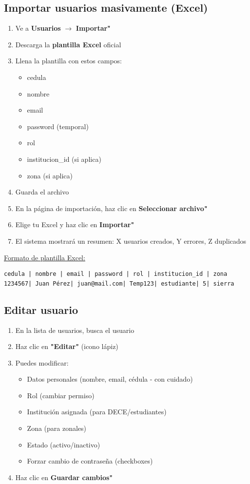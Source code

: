\documentclass[12pt, a4paper]{report}
\begin{document}
\subsection{Importar usuarios masivamente (Excel)}
\begin{enumerate}
    \item Ve a \textbf{Usuarios} $\rightarrow$ \textbf{Importar"}
    \item Descarga la \textbf{plantilla Excel} oficial
    \item Llena la plantilla con estos campos:
    \begin{itemize}
        \item cedula
        \item nombre
        \item email
        \item password (temporal)
        \item rol
        \item institucion\_id (si aplica)
        \item zona (si aplica)
    \end{itemize}
    \item Guarda el archivo
    \item En la página de importación, haz clic en \textbf{Seleccionar archivo"}
    \item Elige tu Excel y haz clic en \textbf{Importar"}
    \item El sistema mostrará un resumen: X usuarios creados, Y errores, Z duplicados
\end{enumerate}

\underline{Formato de plantilla Excel:}
\begin{lstlisting}[basicstyle=\ttfamily\small]
cedula | nombre | email | password | rol | institucion_id | zona
1234567| Juan Pérez| juan@mail.com| Temp123| estudiante| 5| sierra
\end{lstlisting}

\subsection{Editar usuario}
\begin{enumerate}
    \item En la lista de usuarios, busca el usuario
    \item Haz clic en \textbf{"Editar"} (icono lápiz)
    \item Puedes modificar:
    \begin{itemize}
        \item Datos personales (nombre, email, cédula - con cuidado)
        \item Rol (cambiar permiso)
        \item Institución asignada (para DECE/estudiantes)
        \item Zona (para zonales)
        \item Estado (activo/inactivo)
        \item Forzar cambio de contraseña (checkboxes)
    \end{itemize}
    \item Haz clic en \textbf{Guardar cambios"}
\end{enumerate}
\end{document}
